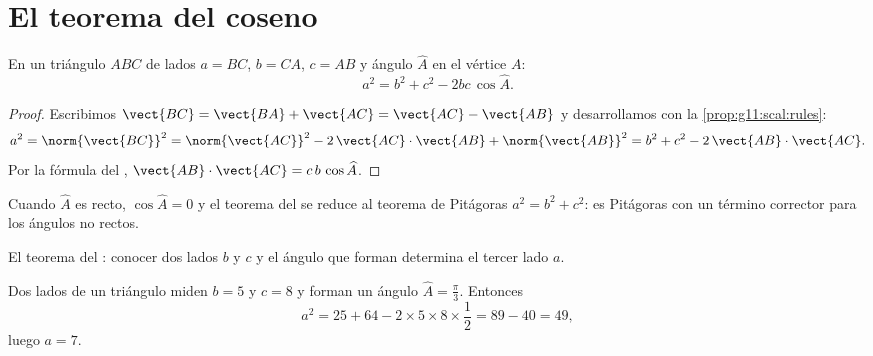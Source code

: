 \section{El teorema del coseno}

\begin{theorem}\label{thm:g11:scal:cosines}
En un triángulo $ABC$ de lados $a = BC$, $b = CA$, $c = AB$ y ángulo
$\widehat A$ en el vértice $A$:
\[
a^2 = b^2 + c^2 - 2bc\,\cos\widehat A .
\]
\end{theorem}

\begin{proof}
Escribimos $\vect{BC} = \vect{BA} + \vect{AC} = \vect{AC} - \vect{AB}$ y
desarrollamos con la \cref{prop:g11:scal:rules}:
\[
a^2 = \norm{\vect{BC}}^2
= \norm{\vect{AC}}^2 - 2\,\vect{AC}\cdot\vect{AB} + \norm{\vect{AB}}^2
= b^2 + c^2 - 2\,\vect{AB}\cdot\vect{AC}.
\]
Por la fórmula del ,
$\vect{AB}\cdot\vect{AC} = c\,b\,\cos\widehat A$.
\end{proof}

\begin{remark}
Cuando $\widehat A$ es recto, $\cos\widehat A = 0$ y el teorema del 
se reduce al teorema de Pitágoras $a^2 = b^2 + c^2$: es Pitágoras con un
término corrector para los ángulos no rectos.
\end{remark}

\begin{omfigure}

{\small El teorema del : conocer dos lados $b$ y $c$ y el ángulo que
forman determina el tercer lado $a$.}
\end{omfigure}

\begin{example}\label{ex:g11:scal:cosines}
Dos lados de un triángulo miden $b = 5$ y $c = 8$ y forman un ángulo
$\widehat A = \frac\pi3$. Entonces
\[
a^2 = 25 + 64 - 2 \times 5 \times 8 \times \frac12 = 89 - 40 = 49,
\]
luego $a = 7$.
\end{example}

